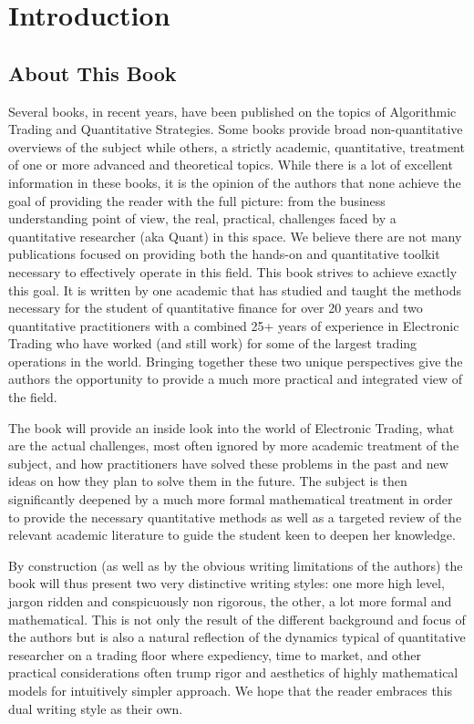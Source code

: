 \chapter{Introduction}\label{chap:ch_intro}
\section{About This Book}

Several books, in recent years, have been published  on the topics of Algorithmic Trading and Quantitative Strategies. Some books provide broad non-quantitative overviews of the subject while others, a strictly academic, quantitative, treatment of one or more advanced and theoretical topics. While there is a lot of excellent information in these books, it is the opinion of the authors that none achieve the goal of providing the reader with the full picture: from the business understanding point of view, the real, practical, challenges faced by a quantitative researcher (aka Quant) in this space. We believe there are not many publications focused on providing both the hands-on and quantitative toolkit necessary to effectively operate in this field. This book strives to achieve exactly this goal. It is written by one academic that has studied and taught the methods necessary for the student of quantitative finance for over 20 years and two quantitative practitioners with a combined 25+ years of experience in Electronic Trading who have worked (and still work) for some of the largest trading operations in the world. Bringing together these two unique perspectives give the authors the opportunity to provide a much more practical and integrated view of the field.


The book will provide an inside look into the world of Electronic Trading, what are the actual challenges, most often ignored by more academic treatment of the subject, and how practitioners have solved these problems in the past and new ideas on how they plan to solve them in the future. The subject is then significantly deepened by a much more formal mathematical treatment in order to provide the necessary quantitative methods as well as a targeted review of the relevant academic literature to guide the student keen to deepen her knowledge.


By construction (as well as by the obvious writing limitations of the authors) the book will thus present two very distinctive writing styles: one more high level, jargon ridden and conspicuously non rigorous, the other, a lot more formal and mathematical. This is not only the result of the different background and focus of the authors but is also a natural reflection of the dynamics typical of quantitative researcher on a trading floor where expediency, time to market, and other practical considerations often trump rigor and aesthetics of highly mathematical models for intuitively simpler approach. We hope that the reader embraces this dual writing style as their own.


